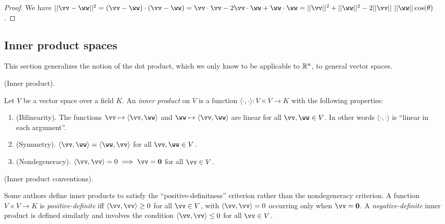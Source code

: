 \begin{proof}
    We have $||\vv - \ww||^2 = (\vv - \ww) \cdot (\vv - \ww) = \vv \cdot \vv - 2 \vv \cdot \ww + \ww \cdot \ww = ||\vv||^2 + ||\ww||^2 - 2 ||\vv|| \spc ||\ww|| \cos(\theta)$.
\end{proof}

\newpage

\subsection*{Inner product spaces}

This section generalizes the notion of the dot product, which we only know to be applicable to $\mathbb{R}^n$, to general vector spaces.

\begin{defn}
    \label{ch::lin_alg::defn::inner_product}
    (Inner product).
    
    Let $V$ be a vector space over a field $K$. An \textit{inner product} on $V$ is a function $\langle \cdot, \cdot \rangle:V \times V \rightarrow K$ with the following properties:

    \begin{enumerate}
        \item (Bilinearity). The functions $\vv \mapsto \langle \vv, \ww \rangle$ and $\ww \mapsto \langle \vv, \ww \rangle$ are linear for all $\vv, \ww \in V$. In other words $\langle \cdot, \cdot \rangle$ is ``linear in each argument''.
        \item (Symmetry). $\langle \vv, \ww \rangle = \langle \ww, \vv \rangle$ for all $\vv, \ww \in V$.
        \item (Nondegeneracy). $\langle \vv, \vv \rangle = 0 \implies \vv = \mathbf{0}$ for all $\vv \in V$.
    \end{enumerate}
\end{defn}

\begin{remark}
    (Inner product conventions).

    Some authors define inner products to satisfy the ``positive-definitness'' criterion rather than the nondegeneracy criterion. A function $V \times V \rightarrow K$ is \textit{positive-definite} iff $\langle \vv, \vv \rangle \geq 0$ for all $\vv \in V$, with $\langle \vv, \vv \rangle = 0$ occurring only when $\vv = \mathbf{0}$. A \textit{negative-definite} inner product is defined similarly and involves the condition $\langle \vv, \vv \rangle \leq 0$ for all $\vv \in V$.
\end{remark}

